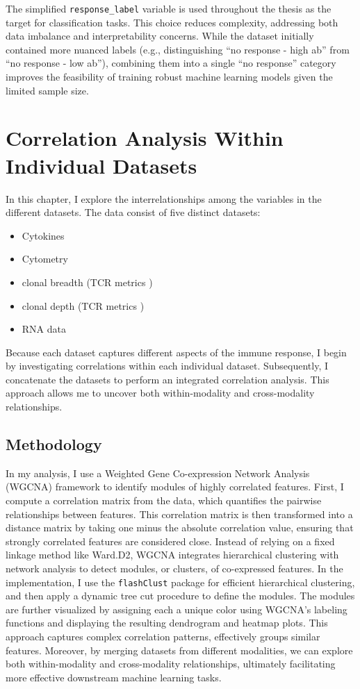 \documentclass[12pt,a4paper]{report}
\newcommand{\todo}[1]{\fcolorbox{black}{yellow}{\textbf{TODO:} #1}}
\begin{document}
\pagebreak
\noindent
The simplified \texttt{response\_label} variable is used throughout the thesis as the target for classification tasks. This choice reduces complexity, addressing both data imbalance and interpretability concerns. While the dataset initially contained more nuanced labels (e.g., distinguishing “no response - high ab” from “no response - low ab”), combining them into a single “no response” category improves the feasibility of training robust machine learning models given the limited sample size.\\

\section{Correlation Analysis Within Individual Datasets}
\noindent
In this chapter, I explore the interrelationships among the variables in the different datasets. The data consist of five distinct datasets:
\begin{itemize}
\item Cytokines
\item Cytometry
\item clonal  breadth (TCR metrics )
\item clonal depth (TCR metrics )
\item RNA data
\end{itemize}
Because each dataset captures different aspects of the immune response, I begin by investigating correlations within each individual dataset. Subsequently, I concatenate the datasets to perform an integrated correlation analysis. This approach allows me to uncover both within-modality and cross-modality relationships.
\subsection{Methodology}
\noindent
\todo{Check if right...}
In my analysis, I use a Weighted Gene Co-expression Network Analysis (WGCNA) framework to identify modules of highly correlated features. First, I compute a correlation matrix from the data, which quantifies the pairwise relationships between features. This correlation matrix is then transformed into a distance matrix by taking one minus the absolute correlation value, ensuring that strongly correlated features are considered close. Instead of relying on a fixed linkage method like Ward.D2, WGCNA integrates hierarchical clustering with network analysis to detect modules, or clusters, of co-expressed features. In the implementation, I use the \texttt{flashClust} package for efficient hierarchical clustering, and then apply a dynamic tree cut procedure to define the modules. The modules are further visualized by assigning each a unique color using WGCNA’s labeling functions and displaying the resulting dendrogram and heatmap plots. This approach captures complex correlation patterns, effectively groups similar features. Moreover, by merging datasets from different modalities, we can explore both within-modality and cross-modality relationships, ultimately facilitating more effective downstream machine learning tasks.
\end{document}
